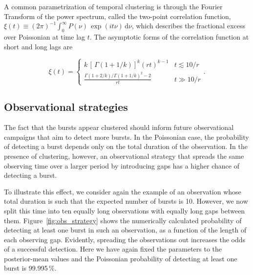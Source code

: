 \documentclass[fleqn,usenatbib]{mnras}
\newcommand{\new}[1]{#1}
\begin{document}
\new{
A common parametrization of temporal clustering is through the Fourier
Transform of the power spectrum, called the two-point correlation function, $\xi(t) \equiv (2\pi)^{-1}\int_0^\infty
P(\nu) \, \exp(i t\nu)\, \mathrm{d}\nu$, which describes the fractional 
excess over Poissonian at time lag $t$. The asymptotic forms of the
correlation function at short and long lags are
}
\begin{equation}
\xi(t)=\left\{ \begin{array}{ll}  k \, \left[\, \Gamma\left(1 + 1/k\right)\right]^k  (rt)^{k-1} & t \lesssim 10/r \\
               \frac{ \Gamma(1 + 2/k)/\Gamma(1 + 1/k)^2 - 2}{rt} & t \gg 10/r\end{array} \right..
\end{equation}


% 


\subsection{Observational strategies}
\label{sec:obs_strategies}

The fact that the bursts appear clustered should inform future observational campaigns that aim to detect more bursts. In the Poissonian case, the probability of detecting a burst depends only on the total duration of the observation. In the presence of clustering, however, an observational strategy that spreads the same observing time over a larger period by introducing gaps has a higher chance of detecting a burst.

To illustrate this effect, we consider \new{again the example of an observation whose total duration is such that the expected number of bursts is 10. However, we now split this time into ten equally long observations with equally long gaps between them.} Figure~\ref{fig:obs_strategy} shows the numerically calculated probability of detecting at least one burst in such an observation, as a function of the length of each observing gap. Evidently, spreading the observations out increases the odds of a successful detection. Here we have again fixed the parameters to the posterior-mean values \new{and the Poissonian probability of detecting at least one burst is 99.995\,\%.}
\end{document}
